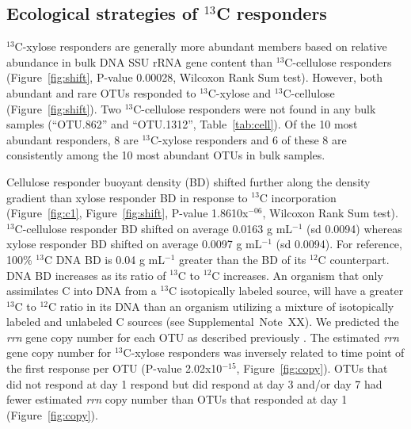 \subsection{Ecological strategies of $^{13}$C responders}
$^{13}$C-xylose responders are generally more abundant members based on
relative abundance in bulk DNA SSU rRNA gene content than $^{13}$C-cellulose
responders (Figure~\ref{fig:shift}, P-value 0.00028, Wilcoxon Rank Sum test).
However, both abundant and rare OTUs responded to $^{13}$C-xylose and
$^{13}$C-cellulose (Figure~\ref{fig:shift}). Two $^{13}$C-cellulose responders
were not found in any bulk samples (``OTU.862'' and ``OTU.1312'',
Table~\ref{tab:cell}). Of the 10 most abundant responders, 8 are
$^{13}$C-xylose responders and 6 of these 8 are consistently among the 10 most
abundant OTUs in bulk samples.

Cellulose responder buoyant density (BD) shifted further along the density
gradient than xylose responder BD in response to $^{13}$C incorporation
(Figure~\ref{fig:c1}, Figure~\ref{fig:shift}, P-value 1.8610x$^{-06}$, Wilcoxon
Rank Sum test). $^{13}$C-cellulose responder BD shifted on average
0.0163 g mL$^{-1}$ (sd 0.0094) whereas xylose responder BD shifted on average
0.0097 g mL$^{-1}$ (sd 0.0094). For reference, 100\% $^{13}$C DNA BD is 0.04
g mL$^{-1}$ greater than the BD of its $^{12}$C counterpart. DNA BD increases
as its ratio of $^{13}$C to $^{12}$C increases. An organism that only
assimilates C into DNA from a $^{13}$C isotopically labeled source, will have
a greater $^{13}$C to $^{12}$C ratio in its DNA than an organism utilizing
a mixture of isotopically labeled and unlabeled C sources (see
Supplemental~Note~XX). We predicted the \textit{rrn} gene copy number for each
OTU as described previously \citep{Kembel_2012}. The estimated
\textit{rrn} gene copy number for $^{13}$C-xylose responders was inversely
related to time point of the first response per OTU (P-value
2.02x10$^{-15}$, Figure~\ref{fig:copy}). OTUs that did not respond at day
1 respond but did respond at day 3 and/or day 7 had fewer estimated
\textit{rrn} copy number than OTUs that responded at day 1
(Figure~\ref{fig:copy}). 

